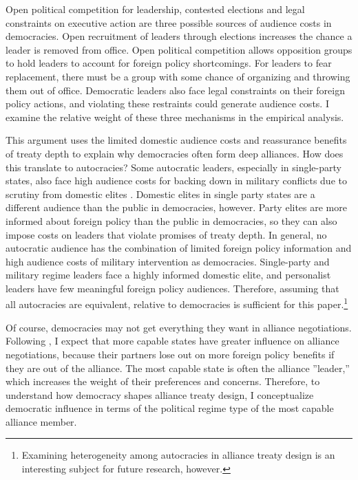 \documentclass[12pt]{article}
\begin{document}
Open political competition for leadership, contested elections and legal constraints on executive action are three possible sources of audience costs in democracies. 
Open recruitment of leaders through elections increases the chance a leader is removed from office. 
Open political competition allows opposition groups to hold leaders to account for foreign policy shortcomings. 
For leaders to fear replacement, there must be a group with some chance of organizing and throwing them out of office.
Democratic leaders also face legal constraints on their foreign policy actions, and violating these restraints could generate audience costs. 
I examine the relative weight of these three mechanisms in the empirical analysis.  


This argument uses the limited domestic audience costs and reassurance benefits of treaty depth to explain why democracies often form deep alliances. 
How does this translate to autocracies? 
Some autocratic leaders, especially in single-party states, also face high audience costs for backing down in military conflicts due to scrutiny from domestic elites \citep{Weeks2014}.
Domestic elites in single party states are a different audience than the public in democracies, however.  
Party elites are more informed about foreign policy than the public in democracies, so they can also impose costs on leaders that violate promises of treaty depth. 
In general, no autocratic audience has the combination of limited foreign policy information and high audience costs of military intervention as democracies.
Single-party and military regime leaders face a highly informed domestic elite, and personalist leaders have few meaningful foreign policy audiences. 
Therefore, assuming that all autocracies are equivalent, relative to democracies is sufficient for this paper.\footnote{Examining heterogeneity among autocracies in alliance treaty design is an interesting subject for future research, however.} 


Of course, democracies may not get everything they want in alliance negotiations. 
Following \citep{Mattes2012}, I expect that more capable states have greater influence on alliance negotiations, because their partners lose out on more foreign policy benefits if they are out of the alliance.
The most capable state is often the alliance ''leader,'' which increases the weight of their preferences and concerns. 
Therefore, to understand how democracy shapes alliance treaty design, I conceptualize democratic influence in terms of the political regime type of the most capable alliance member. 
\end{document}
